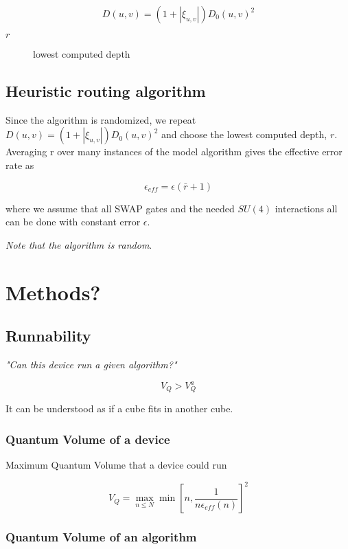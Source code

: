 \documentclass[11pt]{article}
\begin{document}
$$D(u,v) = (1+|\xi_{u,v}|) D_0 (u,v)^2$$

\begin{description}
\item[{\(r\)}] lowest computed depth
\end{description}
\subsection{Heuristic routing algorithm}
\label{sec:org854700d}

Since the algorithm is randomized, we repeat \(D(u,v) = (1+|\xi_{u,v}|) D_0 (u,v)^2\) and choose the lowest computed depth, \(r\).
Averaging r over many instances of the model algorithm gives the effective error rate as

$$\epsilon_{eff} = \epsilon (\bar{r} + 1)$$

where we assume that all SWAP gates and the needed \(SU (4)\) interactions all can be done with constant error \(\epsilon\).

\emph{Note that the algorithm is random}.

\section{Methods?}
\label{sec:org127f6a6}

\subsection{Runnability}
\label{sec:orgf05188a}

\emph{"Can this device run a given algorithm?"}

$$V_Q > V_Q^a$$

It can be understood as if a cube fits in another cube.

\subsubsection{Quantum Volume of a device}
\label{sec:orgd2ccfdf}

Maximum Quantum Volume that a device could run

$$V_Q = \max_{n \le N} \min \left[ n,\frac{1}{n \epsilon_{eff} (n)}\right]^2$$

\subsubsection{Quantum Volume of an algorithm}
\label{sec:orgafa2a8f}
\end{document}
